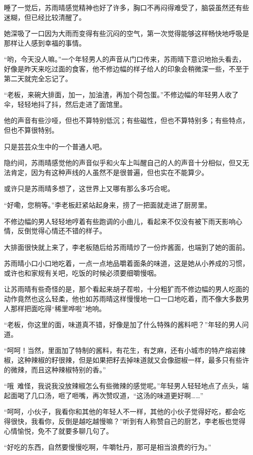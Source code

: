 睡了一觉后，苏雨晴感觉精神也好了许多，胸口不再闷得难受了，脑袋虽然还有些迷糊，但已经比较清醒了。

她深吸了一口因为大雨而变得有些沉闷的空气，第一次觉得能够这样畅快地呼吸是那样让人感到幸福的事情。

“哟，今天没人嘛。”一个年轻男人的声音从门口传来，苏雨晴下意识地抬头看去，好像是昨天来吃过面的食客，他不修边幅的样子给人的印象会稍微深一些，不至于第二天就完全忘记了。

“老板，来碗大排面，加一，加油渣，再加个荷包蛋。”不修边幅的年轻男人收了伞，轻轻地抖了抖，然后走进了面馆里。

他的声音有些沙哑，但也不算特别低沉；有些磁性，但也不算特别多；有些特点，但也不算很特别。

只是芸芸众生中的一个普通人吧。

隐约间，苏雨晴感觉他的声音似乎和火车上叫醒自己的人的声音十分相似，但又无法肯定，因为有这种声线的人虽然不是很普遍，但也实在不能算少。

或许只是苏雨晴多想了，这世界上又哪有那么多巧合呢。

“好嘞，您稍等。”李老板赶紧站起身来，捞了一把面就走进了厨房里。

不修边幅的男人轻轻地哼着有些跑调的小曲儿，看起来不仅没有被下雨天影响心情，反倒觉得心情还不错的样子。

大排面很快就上来了，李老板随后给苏雨晴炒了一份炸酱面，也端到了她的面前。

苏雨晴小口小口地吃着，一点一点地品嚼着面条的味道，这是她从小养成的习惯，或许也和家规有关吧，吃饭的时候必须要细嚼慢咽。

让苏雨晴有些奇怪的是，那个看起来胡子茬啦，十分粗犷而不修边幅的男人吃面的动作竟然也这么轻柔，他也如苏雨晴这样慢慢地一口一口地吃着，而不像大多数男人那样把面吃得“稀里哗啦”地响。

“老板，你这里的面，味道真不错，好像是加了什么特殊的酱料吧？”年轻的男人问道。

“呵呵！当然，里面加了特制的酱料，有花生，有芝麻，还有小城市的特产熔岩辣椒，这种辣椒的籽很辣，但是如果把籽去掉味道就又会像甜椒一样，最多只有些许的微辣，而且这种辣椒特别的香。”

“哦~难怪，我说我没放辣椒怎么有些微辣的感觉呢。”年轻男人轻轻地点了点头，端起面喝了几口汤，咂了咂嘴，再次赞叹道，“这汤的味道更好啊……”

“呵呵，小伙子，我看你和其他的年轻人不一样，其他的小伙子觉得好吃，都会吃得很快，我看你，反倒是越吃越慢嘛？”听到有人称赞自己的厨艺，李老板也觉得心情愉悦，免不了就要多聊几句了。

“好吃的东西，自然要慢慢吃啊，牛嚼牡丹，那可是相当浪费的行为。”

